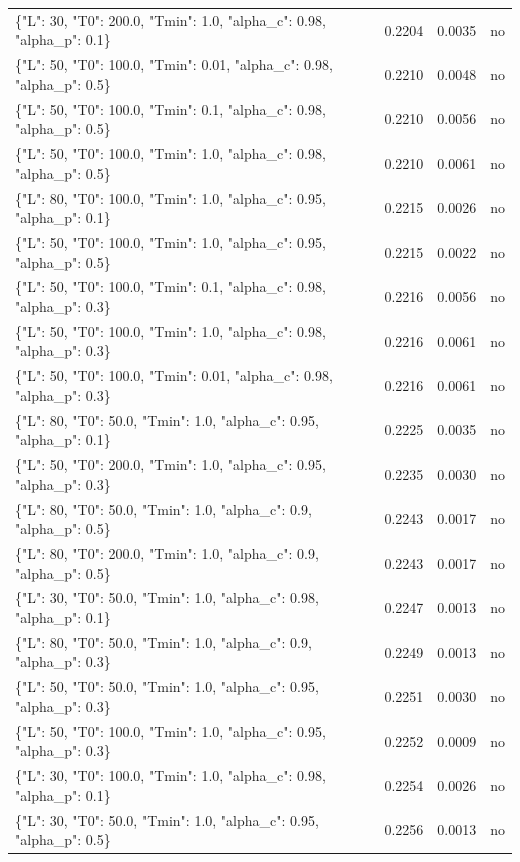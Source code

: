 \begin{table}[htbp]
\begin{tabular}{lrrr}
\{"L": 30, "T0": 200.0, "Tmin": 1.0, "alpha\_c": 0.98, "alpha\_p": 0.1\} & 0.2204 & 0.0035 & no \\
\{"L": 50, "T0": 100.0, "Tmin": 0.01, "alpha\_c": 0.98, "alpha\_p": 0.5\} & 0.2210 & 0.0048 & no \\
\{"L": 50, "T0": 100.0, "Tmin": 0.1, "alpha\_c": 0.98, "alpha\_p": 0.5\} & 0.2210 & 0.0056 & no \\
\{"L": 50, "T0": 100.0, "Tmin": 1.0, "alpha\_c": 0.98, "alpha\_p": 0.5\} & 0.2210 & 0.0061 & no \\
\{"L": 80, "T0": 100.0, "Tmin": 1.0, "alpha\_c": 0.95, "alpha\_p": 0.1\} & 0.2215 & 0.0026 & no \\
\{"L": 50, "T0": 100.0, "Tmin": 1.0, "alpha\_c": 0.95, "alpha\_p": 0.5\} & 0.2215 & 0.0022 & no \\
\{"L": 50, "T0": 100.0, "Tmin": 0.1, "alpha\_c": 0.98, "alpha\_p": 0.3\} & 0.2216 & 0.0056 & no \\
\{"L": 50, "T0": 100.0, "Tmin": 1.0, "alpha\_c": 0.98, "alpha\_p": 0.3\} & 0.2216 & 0.0061 & no \\
\{"L": 50, "T0": 100.0, "Tmin": 0.01, "alpha\_c": 0.98, "alpha\_p": 0.3\} & 0.2216 & 0.0061 & no \\
\{"L": 80, "T0": 50.0, "Tmin": 1.0, "alpha\_c": 0.95, "alpha\_p": 0.1\} & 0.2225 & 0.0035 & no \\
\{"L": 50, "T0": 200.0, "Tmin": 1.0, "alpha\_c": 0.95, "alpha\_p": 0.3\} & 0.2235 & 0.0030 & no \\
\{"L": 80, "T0": 50.0, "Tmin": 1.0, "alpha\_c": 0.9, "alpha\_p": 0.5\} & 0.2243 & 0.0017 & no \\
\{"L": 80, "T0": 200.0, "Tmin": 1.0, "alpha\_c": 0.9, "alpha\_p": 0.5\} & 0.2243 & 0.0017 & no \\
\{"L": 30, "T0": 50.0, "Tmin": 1.0, "alpha\_c": 0.98, "alpha\_p": 0.1\} & 0.2247 & 0.0013 & no \\
\{"L": 80, "T0": 50.0, "Tmin": 1.0, "alpha\_c": 0.9, "alpha\_p": 0.3\} & 0.2249 & 0.0013 & no \\
\{"L": 50, "T0": 50.0, "Tmin": 1.0, "alpha\_c": 0.95, "alpha\_p": 0.3\} & 0.2251 & 0.0030 & no \\
\{"L": 50, "T0": 100.0, "Tmin": 1.0, "alpha\_c": 0.95, "alpha\_p": 0.3\} & 0.2252 & 0.0009 & no \\
\{"L": 30, "T0": 100.0, "Tmin": 1.0, "alpha\_c": 0.98, "alpha\_p": 0.1\} & 0.2254 & 0.0026 & no \\
\{"L": 30, "T0": 50.0, "Tmin": 1.0, "alpha\_c": 0.95, "alpha\_p": 0.5\} & 0.2256 & 0.0013 & no \\

\end{tabular}
\end{table}
